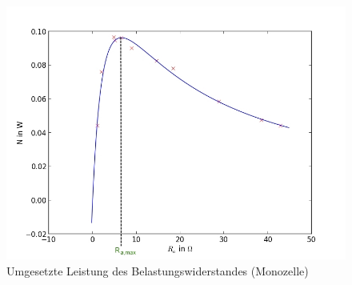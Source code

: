 	\begin{figure}[h]
		\begin{center}
		\includegraphics[scale=0.5]{pice.jpg}
		\caption{Umgesetzte Leistung des Belastungswiderstandes (Monozelle)}
		\label{pice}
		\end{center}	
	\end{figure}